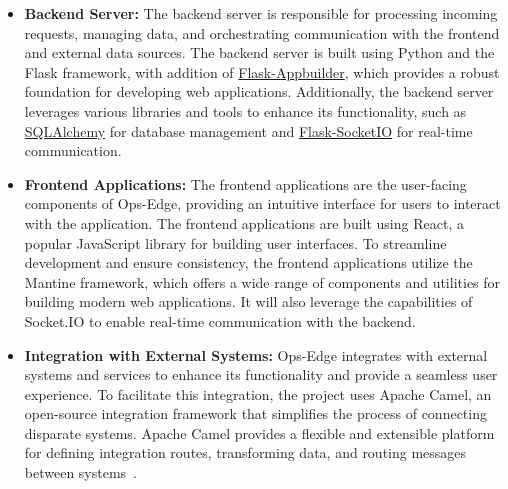 \begin{itemize}
    \item \textbf{Backend Server:} The backend server is responsible for processing incoming requests, managing data, and orchestrating communication with the frontend and external data sources. The backend server is built using Python and the Flask framework, with addition of \href{https://flask-appbuilder.readthedocs.io/en/latest/}{Flask-Appbuilder}, which provides a robust foundation for developing web applications. Additionally, the backend server leverages various libraries and tools to enhance its functionality, such as \href{https://www.sqlalchemy.org/}{SQLAlchemy} for database management and \href{https://flask-socketio.readthedocs.io/en/latest/}{Flask-SocketIO} for real-time communication.

    \item \textbf{Frontend Applications:} The frontend applications are the user-facing components of Ops-Edge, providing an intuitive interface for users to interact with the application. The frontend applications are built using React, a popular JavaScript library for building user interfaces. To streamline development and ensure consistency, the frontend applications utilize the Mantine framework, which offers a wide range of components and utilities for building modern web applications. It will also leverage the capabilities of Socket.IO to enable real-time communication with the backend.

    \item \textbf{Integration with External Systems:} Ops-Edge integrates with external systems and services to enhance its functionality and provide a seamless user experience. To facilitate this integration, the project uses Apache Camel, an open-source integration framework that simplifies the process of connecting disparate systems. Apache Camel provides a flexible and extensible platform for defining integration routes, transforming data, and routing messages between systems~\cite{noauthor_home_2024}.
\end{itemize}